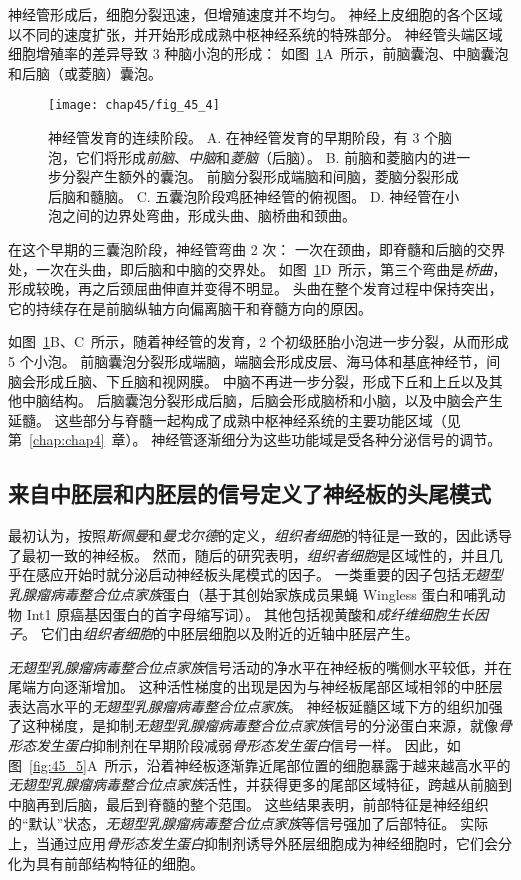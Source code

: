 神经管形成后，细胞分裂迅速，但增殖速度并不均匀。
神经上皮细胞的各个区域以不同的速度扩张，并开始形成成熟中枢神经系统的特殊部分。
神经管头端区域细胞增殖率的差异导致 3 种脑小泡的形成：
如图~\ref{fig:45_4}A~所示，前脑囊泡、中脑囊泡和后脑（或菱脑）囊泡。


\begin{figure}[htbp]
	\centering
	\texttt{[image: chap45/fig\_45\_4]}
	\caption{神经管发育的连续阶段。
		A. 在神经管发育的早期阶段，有 3 个脑泡，它们将形成\textit{前脑}、\textit{中脑}和\textit{菱脑}（后脑）。
		B. 前脑和菱脑内的进一步分裂产生额外的囊泡。
		前脑分裂形成端脑和间脑，菱脑分裂形成后脑和髓脑。
		C. 五囊泡阶段鸡胚神经管的俯视图。
		D. 神经管在小泡之间的边界处弯曲，形成头曲、脑桥曲和颈曲。}
	\label{fig:45_4}
\end{figure}


在这个早期的三囊泡阶段，神经管弯曲 2 次：
一次在颈曲，即脊髓和后脑的交界处，一次在头曲，即后脑和中脑的交界处。
如图~\ref{fig:45_4}D~所示，第三个弯曲是\textit{桥曲}，形成较晚，再之后颈屈曲伸直并变得不明显。
头曲在整个发育过程中保持突出，它的持续存在是前脑纵轴方向偏离脑干和脊髓方向的原因。


如图~\ref{fig:45_4}B、C~所示，随着神经管的发育，2 个初级胚胎小泡进一步分裂，从而形成 5 个小泡。
前脑囊泡分裂形成端脑，端脑会形成皮层、海马体和基底神经节，间脑会形成丘脑、下丘脑和视网膜。
中脑不再进一步分裂，形成下丘和上丘以及其他中脑结构。
后脑囊泡分裂形成后脑，后脑会形成脑桥和小脑，以及中脑会产生延髓。
这些部分与脊髓一起构成了成熟中枢神经系统的主要功能区域（见第~\ref{chap:chap4}~章）。
神经管逐渐细分为这些功能域是受各种分泌信号的调节。



\subsection{来自中胚层和内胚层的信号定义了神经板的头尾模式}

最初认为，按照\textit{斯佩曼}和\textit{曼戈尔德}的定义，\textit{组织者细胞}的特征是一致的，因此诱导了最初一致的神经板。
然而，随后的研究表明，\textit{组织者细胞}是区域性的，并且几乎在感应开始时就分泌启动神经板头尾模式的因子。
一类重要的因子包括\textit{无翅型乳腺瘤病毒整合位点家族}蛋白（基于其创始家族成员果蝇 Wingless 蛋白和哺乳动物 Int1 原癌基因蛋白的首字母缩写词）。
其他包括视黄酸和\textit{成纤维细胞生长因子}。
它们由\textit{组织者细胞}的中胚层细胞以及附近的近轴中胚层产生。


\textit{无翅型乳腺瘤病毒整合位点家族}信号活动的净水平在神经板的嘴侧水平较低，并在尾端方向逐渐增加。
这种活性梯度的出现是因为与神经板尾部区域相邻的中胚层表达高水平的\textit{无翅型乳腺瘤病毒整合位点家族}。
神经板延髓区域下方的组织加强了这种梯度，是抑制\textit{无翅型乳腺瘤病毒整合位点家族}信号的分泌蛋白来源，就像\textit{骨形态发生蛋白}抑制剂在早期阶段减弱\textit{骨形态发生蛋白}信号一样。
因此，如图~\ref{fig:45_5}A~所示，沿着神经板逐渐靠近尾部位置的细胞暴露于越来越高水平的\textit{无翅型乳腺瘤病毒整合位点家族}活性，并获得更多的尾部区域特征，跨越从前脑到中脑再到后脑，最后到脊髓的整个范围。
这些结果表明，前部特征是神经组织的“默认”状态，\textit{无翅型乳腺瘤病毒整合位点家族}等信号强加了后部特征。
实际上，当通过应用\textit{骨形态发生蛋白}抑制剂诱导外胚层细胞成为神经细胞时，它们会分化为具有前部结构特征的细胞。


